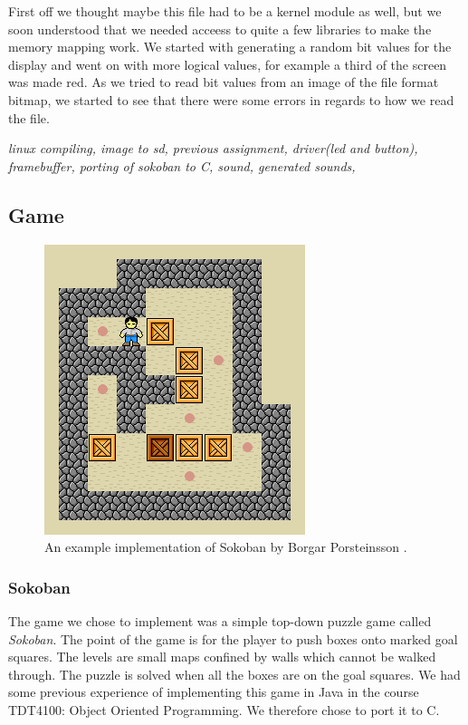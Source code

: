 \documentclass[a4paper,11pt]{article}
\begin{document}
First off we thought maybe this file had to be a kernel module as well, but we soon understood that we needed acceess to quite a few libraries to make the memory mapping work. We started with generating a random bit values for the display and went on with more logical values, for example a third of the screen was made red. As we tried to read bit values from an image of the file format bitmap, we started to see that there were some errors in regards to how we read the file. 

\emph{linux compiling, image to sd, previous assignment, driver(led and button), framebuffer, porting of sokoban to C, sound, generated sounds, }

\subsection{Game}
\begin{figure}[h]
\centering
\includegraphics{images/sokoban.png}
\caption{An example implementation of Sokoban by Borgar Porsteinsson \cite{sokobanscreen}.}
\label{fig:sokobanimage}
\end{figure}

\subsubsection{Sokoban}
The game we chose to implement was a simple top-down puzzle game called \textit{Sokoban}\cite{sokoban}. The point of the game is for the player to push boxes onto marked goal squares. The levels are small maps confined by walls which cannot be walked through. The puzzle is solved when all the boxes are on the goal squares. We had some previous experience of implementing this game in Java in the course TDT4100: Object Oriented Programming. We therefore chose to port it to C.
\end{document}
